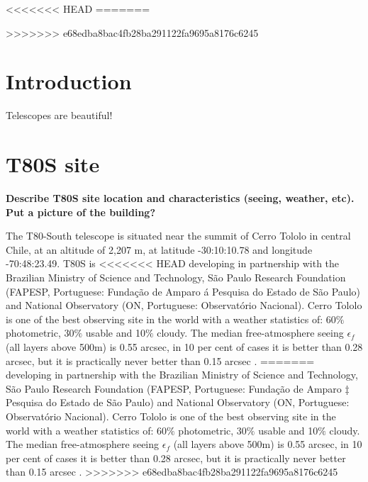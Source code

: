 \documentclass[12pt,preprint]{aastex}
\begin{document}
<<<<<<< HEAD
=======

>>>>>>> e68edba8bac4fb28ba291122fa9695a8176c6245

\section{Introduction}

Telescopes are beautiful! \citep{Benitez.etal.2014a}


\section{T80S site}

{\bf \color{red} Describe T80S site location and characteristics (seeing, weather, etc). Put a picture of the building?}

The T80-South telescope is situated near the summit of Cerro Tololo in central Chile, at an altitude of 2,207 m, at latitude -30:10:10.78 and longitude -70:48:23.49. T80S  is
<<<<<<< HEAD
developing in partnership with the Brazilian Ministry of Science and Technology, S\~ao Paulo Research Foundation (FAPESP, Portuguese: Funda\c c\~ao de Amparo \'a Pesquisa do Estado de S\~ao Paulo) and National Observatory (ON, Portuguese: Observat\'orio Nacional). Cerro Tololo is one of the best observing site in the world with a weather statistics of: 60$\%$ photometric, 30$\%$ usable and 10$\%$ cloudy. The median free-atmosphere seeing $\epsilon_f$ (all layers above 500m) is 0.55 arcsec, in 10 per cent of cases it is better than 0.28 arcsec, but it is practically never better than 0.15 arcsec \citep{Tokovinin.Baumont.Vasquez.2003a}.
=======
developing in partnership with the Brazilian Ministry of Science and Technology, São Paulo Research Foundation (FAPESP, Portuguese: Funda\c c\~ao de Amparo ‡ Pesquisa do Estado de S\~ao Paulo) and National Observatory (ON, Portuguese: Observat\'orio Nacional). Cerro Tololo is one of the best observing site in the world with a weather statistics of: 60$\%$ photometric, 30$\%$ usable and 10$\%$ cloudy. The median free-atmosphere seeing $\epsilon_f$ (all layers above 500m) is 0.55 arcsec, in 10 per cent of cases it is better than 0.28
arcsec, but it is practically never better than 0.15 arcsec \citep{Tokovinin.Baumont.Vasquez.2003a}.
>>>>>>> e68edba8bac4fb28ba291122fa9695a8176c6245
\end{document}
